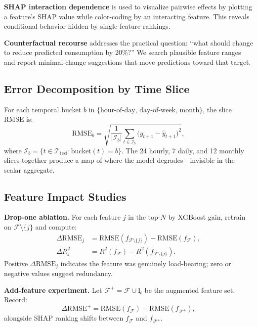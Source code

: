 \documentclass[10pt,twocolumn,letterpaper]{article}
\begin{document}
\textbf{SHAP interaction dependence} is used to visualize pairwise
effects by plotting a feature's SHAP value while color-coding by an
interacting feature. This reveals conditional behavior hidden by
single-feature rankings.

\textbf{Counterfactual recourse} addresses the practical question:
``what should change to reduce predicted consumption by 20\%?'' We
search plausible feature ranges and report minimal-change suggestions
that move predictions toward that target.

\subsection{Error Decomposition by Time Slice}

For each temporal bucket $b$ in $\{\text{hour-of-day, day-of-week,
month}\}$, the slice RMSE is:
\begin{equation}
  \text{RMSE}_{b} =
  \sqrt{\frac{1}{|\mathcal{I}_b|}\sum_{t \in \mathcal{I}_b}
  \bigl(y_{t+1} - \hat{y}_{t+1}\bigr)^2},
  \label{eq:slice_rmse}
\end{equation}
where $\mathcal{I}_b = \{t \in \mathcal{T}_{\text{test}} :
\text{bucket}(t) = b\}$. The 24 hourly, 7 daily, and 12 monthly
slices together produce a map of where the model degrades---invisible
in the scalar aggregate.

\subsection{Feature Impact Studies}

\textbf{Drop-one ablation.} For each feature $j$ in the top-$N$ by
XGBoost gain, retrain on $\mathcal{F}\setminus\{j\}$ and compute:
\begin{align}
  \Delta\text{RMSE}_j &=
    \text{RMSE}(f_{\mathcal{F}\setminus\{j\}}) - \text{RMSE}(f_{\mathcal{F}}),
    \label{eq:ablation_rmse}\\
  \Delta R^2_j &=
    R^2(f_{\mathcal{F}}) - R^2\!\left(f_{\mathcal{F}\setminus\{j\}}\right).
    \label{eq:ablation_r2}
\end{align}
Positive $\Delta\text{RMSE}_j$ indicates the feature was genuinely
load-bearing; zero or negative values suggest redundancy.

\textbf{Add-feature experiment.} Let
$\mathcal{F}^+ = \mathcal{F} \cup \mathbf{l}_t$ be the augmented
feature set. Record:
\begin{equation}
  \Delta\text{RMSE}^+ =
  \text{RMSE}(f_{\mathcal{F}}) - \text{RMSE}(f_{\mathcal{F}^+}),
  \label{eq:add_feat}
\end{equation}
alongside SHAP ranking shifts between $f_{\mathcal{F}}$ and
$f_{\mathcal{F}^+}$.
\end{document}
